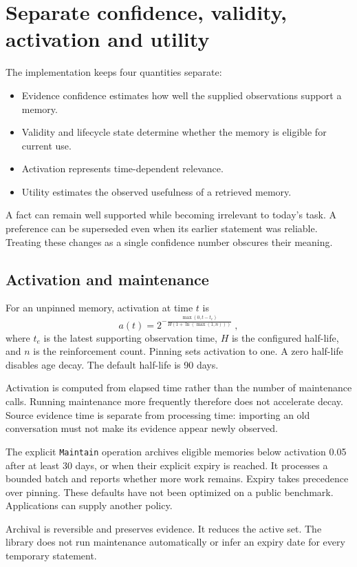 \documentclass[11pt]{article}
\begin{document}
\section{Separate confidence, validity, activation and utility}
The implementation keeps four quantities separate:
\begin{itemize}
\item Evidence confidence estimates how well the supplied observations support a memory.
\item Validity and lifecycle state determine whether the memory is eligible for current use.
\item Activation represents time-dependent relevance.
\item Utility estimates the observed usefulness of a retrieved memory.
\end{itemize}
A fact can remain well supported while becoming irrelevant to today's task. A preference can be superseded even when its earlier statement was reliable. Treating these changes as a single confidence number obscures their meaning.

\subsection{Activation and maintenance}
For an unpinned memory, activation at time $t$ is
\[
a(t)=2^{-\frac{\max(0,t-t_e)}
{H(1+\ln(\max(1,n)))}}\;,
\]
where $t_e$ is the latest supporting observation time, $H$ is the configured half-life, and $n$ is the reinforcement count. Pinning sets activation to one. A zero half-life disables age decay. The default half-life is 90 days.

Activation is computed from elapsed time rather than the number of maintenance calls. Running maintenance more frequently therefore does not accelerate decay. Source evidence time is separate from processing time: importing an old conversation must not make its evidence appear newly observed.

The explicit \texttt{Maintain} operation archives eligible memories below activation 0.05 after at least 30 days, or when their explicit expiry is reached. It processes a bounded batch and reports whether more work remains. Expiry takes precedence over pinning. These defaults have not been optimized on a public benchmark. Applications can supply another policy.

Archival is reversible and preserves evidence. It reduces the active set. The library does not run maintenance automatically or infer an expiry date for every temporary statement.
\end{document}
